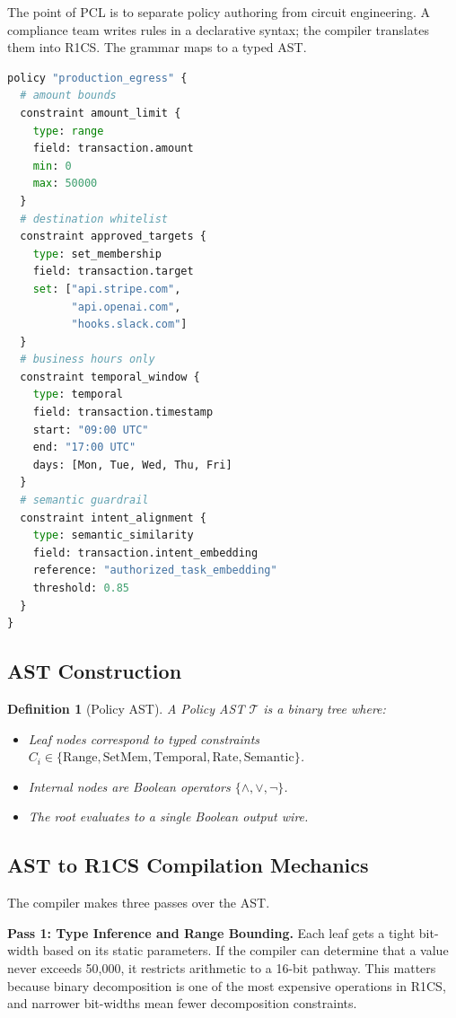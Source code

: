 \documentclass[10pt,conference]{IEEEtran}
\newtheorem{definition}{Definition}
\begin{document}
The point of PCL is to separate policy authoring from circuit engineering. A compliance team writes rules in a declarative syntax; the compiler translates them into R1CS. The grammar maps to a typed AST.

\begin{lstlisting}[language=Python, caption={Example PCL policy specification.}, label={lst:pcl}]
policy "production_egress" {
  # amount bounds
  constraint amount_limit {
    type: range
    field: transaction.amount
    min: 0
    max: 50000
  }
  # destination whitelist
  constraint approved_targets {
    type: set_membership
    field: transaction.target
    set: ["api.stripe.com",
          "api.openai.com",
          "hooks.slack.com"]
  }
  # business hours only
  constraint temporal_window {
    type: temporal
    field: transaction.timestamp
    start: "09:00 UTC"
    end: "17:00 UTC"
    days: [Mon, Tue, Wed, Thu, Fri]
  }
  # semantic guardrail
  constraint intent_alignment {
    type: semantic_similarity
    field: transaction.intent_embedding
    reference: "authorized_task_embedding"
    threshold: 0.85
  }
}
\end{lstlisting}

\subsection{AST Construction}

\begin{definition}[Policy AST]
A Policy AST $\mathcal{T}$ is a binary tree where:
\begin{itemize}
    \item Leaf nodes correspond to typed constraints $C_i \in \{\text{Range}, \text{SetMem}, \text{Temporal}, \text{Rate}, \text{Semantic}\}$.
    \item Internal nodes are Boolean operators $\{\land, \lor, \neg\}$.
    \item The root evaluates to a single Boolean output wire.
\end{itemize}
\end{definition}

\subsection{AST to R1CS Compilation Mechanics}

The compiler makes three passes over the AST.

\textbf{Pass 1: Type Inference and Range Bounding.} Each leaf gets a tight bit-width based on its static parameters. If the compiler can determine that a value never exceeds 50,000, it restricts arithmetic to a 16-bit pathway. This matters because binary decomposition is one of the most expensive operations in R1CS, and narrower bit-widths mean fewer decomposition constraints.
\end{document}
